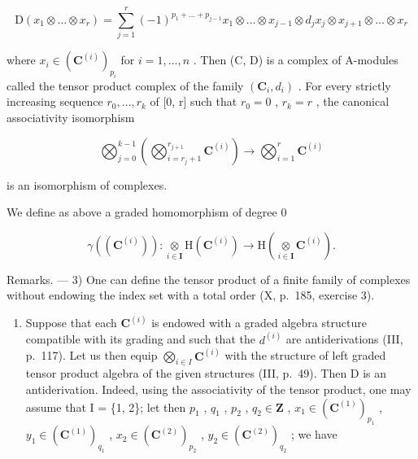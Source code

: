 \[
\mathrm{D} \left(x _ {1} \otimes \dots \otimes x _ {r}\right) = \sum_ {j = 1} ^ {r} (- 1) ^ {p _ {1} + \dots + p _ {j - 1}} x _ {1} \otimes \dots \otimes x _ {j - 1} \otimes d _ {j} x _ {j} \otimes x _ {j + 1} \otimes \dots \otimes x _ {r}
\]

where \(x_{i}\in (\mathbf{C}^{(i)})_{p_{i}}\) for \(i = 1,\dots,n\) . Then (C, D) is a complex of A-modules called the tensor product complex of the family \((\mathbf{C}_{i}, d_{i})\) . For every strictly increasing sequence \(r_{0}, \ldots, r_{k}\) of [0, r] such that \(r_{0} = 0\) , \(r_{k} = r\) , the canonical associativity isomorphism

\[
\bigotimes_ {j = 0} ^ {k - 1} \left(\bigotimes_ {i = r _ {j} + 1} ^ {r _ {j + 1}} \mathbf {C} ^ {(i)}\right)\rightarrow \bigotimes_ {i = 1} ^ {r} \mathbf {C} ^ {(i)}
\]

is an isomorphism of complexes.

We define as above a graded homomorphism of degree 0

\[
\gamma ((\mathbf {C} ^ {(i)})): \underset {i \in \mathbf {I}} {\otimes} \mathrm{H} (\mathbf {C} ^ {(i)}) \to \mathrm{H} \left(\underset {i \in \mathbf {I}} {\otimes} \mathbf {C} ^ {(i)}\right) .
\]

Remarks. --- 3) One can define the tensor product of a finite family of complexes without endowing the index set with a total order (X, p.~185, exercise 3).

\begin{enumerate}
\def\labelenumi{\arabic{enumi})}
\setcounter{enumi}{3}
\tightlist
\item
  Suppose that each \(\mathbf{C}^{(i)}\) is endowed with a graded algebra structure compatible with its grading and such that the \(d^{(i)}\) are antiderivations (III, p.~117). Let us then equip \(\bigotimes_{i\in I}\mathbf{C}^{(i)}\) with the structure of left graded tensor product algebra of the given structures (III, p.~49). Then D is an antiderivation. Indeed, using the associativity of the tensor product, one may assume that I = \{1, 2\}; let then \(p_1\) , \(q_1\) , \(p_2\) , \(q_2 \in \mathbf{Z}\) , \(x_1 \in (\mathbf{C}^{(1)})_{p_1}\) , \(y_1 \in (\mathbf{C}^{(1)})_{q_1}\) , \(x_2 \in (\mathbf{C}^{(2)})_{p_2}\) , \(y_2 \in (\mathbf{C}^{(2)})_{q_2}\) ; we have
\end{enumerate}

